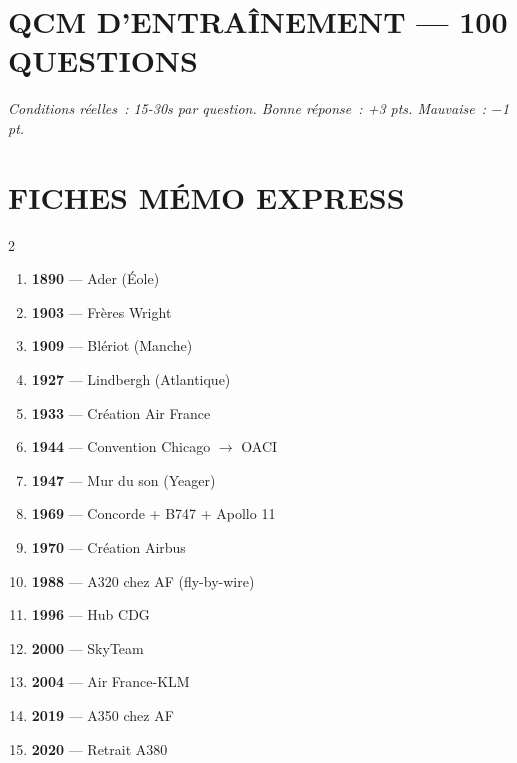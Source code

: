 \documentclass[11pt,a4paper]{article}
\begin{document}
\newpage
\section{QCM D'ENTRAÎNEMENT --- 100 QUESTIONS}

\textit{Conditions réelles~: 15-30s par question. Bonne réponse~: +3 pts. Mauvaise~: $-$1 pt.}





\newpage
\section*{FICHES MÉMO EXPRESS}

\begin{tcolorbox}[colback=aflight, colframe=afblue, title=\textbf{Top 15 Dates Incontournables}]
\begin{multicols}{2}
\begin{enumerate}[nosep]
\item \textbf{1890} --- Ader (Éole)
\item \textbf{1903} --- Frères Wright
\item \textbf{1909} --- Blériot (Manche)
\item \textbf{1927} --- Lindbergh (Atlantique)
\item \textbf{1933} --- Création Air France
\item \textbf{1944} --- Convention Chicago $\to$ OACI
\item \textbf{1947} --- Mur du son (Yeager)
\item \textbf{1969} --- Concorde + B747 + Apollo 11
\item \textbf{1970} --- Création Airbus
\item \textbf{1988} --- A320 chez AF (fly-by-wire)
\item \textbf{1996} --- Hub CDG
\item \textbf{2000} --- SkyTeam
\item \textbf{2004} --- Air France-KLM
\item \textbf{2019} --- A350 chez AF
\item \textbf{2020} --- Retrait A380
\end{enumerate}
\end{multicols}
\end{tcolorbox}
\end{document}
